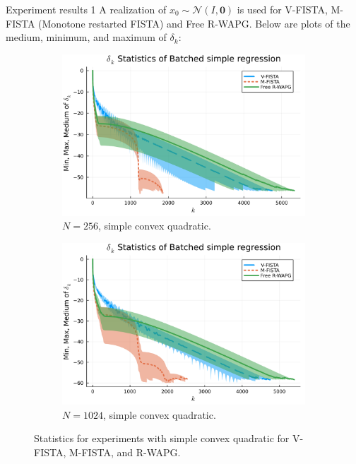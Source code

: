 \documentclass[11pt]{beamer}
\theoremstyle{definition}
\begin{document}
    \begin{frame}{Experiment results 1}
        A realization of $x_0 \sim \mathcal N(I, \mathbf 0)$ is used for V-FISTA, M-FISTA (Monotone restarted FISTA) and Free R-WAPG. 
        Below are plots of the medium, minimum, and maximum of $\delta_k$: 
        \begin{figure}[H]
            \begin{subfigure}[b]{0.47\textwidth}
                \centering
                \includegraphics[width=\textwidth]{assets/simple_regression_batched-256.png}
                \caption{$N = 256$, simple convex quadratic.}
            \end{subfigure}
            \hfill
            \begin{subfigure}[b]{0.47\textwidth}
                \centering
                \includegraphics[width=\textwidth]{assets/simple_regression_batched-1024.png}
                \caption{$N = 1024$, simple convex quadratic. }
            \end{subfigure}
            \caption{
                Statistics for experiments with simple convex quadratic for V-FISTA, M-FISTA, and R-WAPG.
            }
            \label{fig:simple-quadratic-NOG}
        \end{figure}
    \end{frame}
\end{document}
